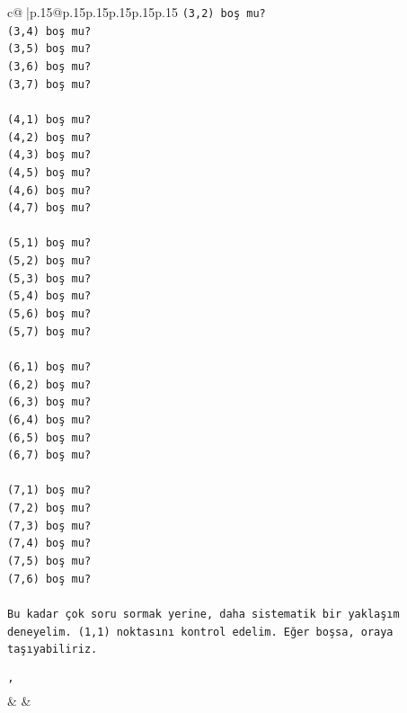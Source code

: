 \documentclass{article}
\begin{document}
{\begin{supertabular}{c@{$\;$}|p{.15\linewidth}@{}p{.15\linewidth}p{.15\linewidth}p{.15\linewidth}p{.15\linewidth}p{.15\linewidth}}
{{{\texttt{(3,2) boş mu?} \\
\texttt{(3,4) boş mu?} \\
\texttt{(3,5) boş mu?} \\
\texttt{(3,6) boş mu?} \\
\texttt{(3,7) boş mu?} \\
\\ 
\texttt{(4,1) boş mu?} \\
\texttt{(4,2) boş mu?} \\
\texttt{(4,3) boş mu?} \\
\texttt{(4,5) boş mu?} \\
\texttt{(4,6) boş mu?} \\
\texttt{(4,7) boş mu?} \\
\\ 
\texttt{(5,1) boş mu?} \\
\texttt{(5,2) boş mu?} \\
\texttt{(5,3) boş mu?} \\
\texttt{(5,4) boş mu?} \\
\texttt{(5,6) boş mu?} \\
\texttt{(5,7) boş mu?} \\
\\ 
\texttt{(6,1) boş mu?} \\
\texttt{(6,2) boş mu?} \\
\texttt{(6,3) boş mu?} \\
\texttt{(6,4) boş mu?} \\
\texttt{(6,5) boş mu?} \\
\texttt{(6,7) boş mu?} \\
\\ 
\texttt{(7,1) boş mu?} \\
\texttt{(7,2) boş mu?} \\
\texttt{(7,3) boş mu?} \\
\texttt{(7,4) boş mu?} \\
\texttt{(7,5) boş mu?} \\
\texttt{(7,6) boş mu?} \\
\\ 
\texttt{Bu kadar çok soru sormak yerine, daha sistematik bir yaklaşım deneyelim. (1,1) noktasını kontrol edelim. Eğer boşsa, oraya taşıyabiliriz.} \\
\\ 
\texttt{'} \\
            }
        }
    }
    & & \\ \\


\end{supertabular}}
\end{document}
